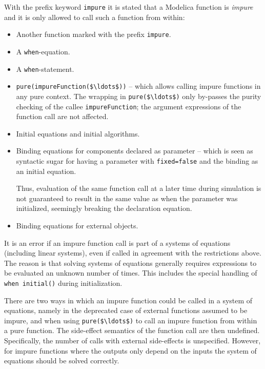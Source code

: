 With the prefix keyword \lstinline!impure! it is stated that a Modelica function is \emph{impure} and it is only allowed to call such a function from within:
\begin{itemize}
\item
  Another function marked with the prefix \lstinline!impure!.
\item
  A \lstinline!when!-equation.
\item
  A \lstinline!when!-statement.
\item
  \lstinline!pure(impureFunction($\ldots$))! -- which allows calling impure functions in any pure context.
  The wrapping in \lstinline!pure($\ldots$)! only by-passes the purity checking of the callee \lstinline!impureFunction!; the argument expressions of the function call are not affected.
\item
  Initial equations and initial algorithms.
\item
  Binding equations for components declared as parameter -- which is seen as syntactic sugar for having a parameter with \lstinline!fixed=false! and the binding as an initial equation.
  \begin{nonnormative}
  Thus, evaluation of the same function call at a later time during simulation is not guaranteed to result in the same value as when the parameter
  was initialized, seemingly breaking the declaration equation.
  \end{nonnormative}
\item
  Binding equations for external objects.
\end{itemize}

It is an error if an impure function call is part of a systems of equations (including linear systems), even if called in agreement with the restrictions above.
The reason is that solving systems of equations generally requires expressions to be evaluated an unknown number of times.
This includes the special handling of \lstinline!when initial()! during initialization.

There are two ways in which an impure function could be called in a system of equations, namely in the deprecated case of external functions assumed to be impure, and when using \lstinline!pure($\ldots$)! to call an impure function from within a pure function.
The side-effect semantics of the function call are then undefined.
Specifically, the number of calls with external side-effects is unspecified.
However, for impure functions where the outputs only depend on the inputs the system of equations should be solved correctly.


